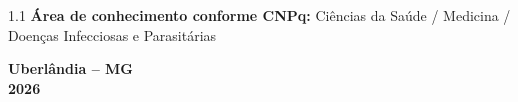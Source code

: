 \documentclass[12pt,a4paper]{article}
\begin{document}
\begin{titlepage}
\begin{center}
\begin{flushright}
\begin{minipage}{9.5cm}
\begin{spacing}{1.1}
                    \textbf{Área de conhecimento conforme CNPq:} Ciências da Saúde / Medicina / Doenças Infecciosas e Parasitárias
                \end{spacing}
            \end{minipage}
        \end{flushright}
        
        \vfill
        
        \textbf{Uberlândia -- MG}\\
        \textbf{2026}
    \end{center}
\end{titlepage}

\newpage
{} %

\tableofcontents
\newpage

\end{document}
